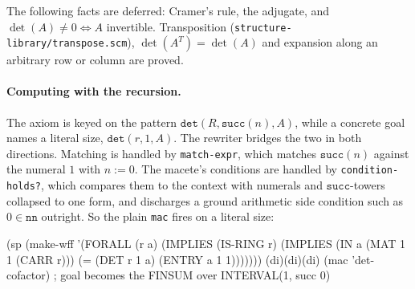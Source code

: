 \begin{remark}
The following facts are deferred: Cramer's rule, the adjugate, and
$\det(A) \ne 0 \Leftrightarrow A$ invertible.  Transposition
(\texttt{structure-library/transpose.scm}), $\det(A^{T}) = \det(A)$ and
expansion along an arbitrary row or column are proved.
\end{remark}

\paragraph{Computing with the recursion.}
The axiom is keyed on the pattern
$\mathtt{det}(R, \mathtt{succ}(n), A)$, while a concrete goal names a
literal size, $\mathtt{det}(r, 1, A)$.  The rewriter bridges the two in
both directions.  Matching is handled by \texttt{match-expr}, which
matches $\mathtt{succ}(n)$ against the numeral $1$ with $n := 0$.  The
macete's conditions are handled by \texttt{condition-holds?}, which
compares them to the context with numerals and $\mathtt{succ}$-towers
collapsed to one form, and discharges a ground arithmetic side condition
such as $0 \in \mathtt{nn}$ outright.  So the plain \texttt{mac} fires
on a literal size:

\begin{VNBcode}
(sp (make-wff '(FORALL (r a)
     (IMPLIES (IS-RING r)
       (IMPLIES (IN a (MAT 1 1 (CARR r)))
         (= (DET r 1 a) (ENTRY a 1 1)))))))
(di)(di)(di)
(mac 'det-cofactor)   ; goal becomes the FINSUM over INTERVAL(1, succ 0)
\end{VNBcode}
